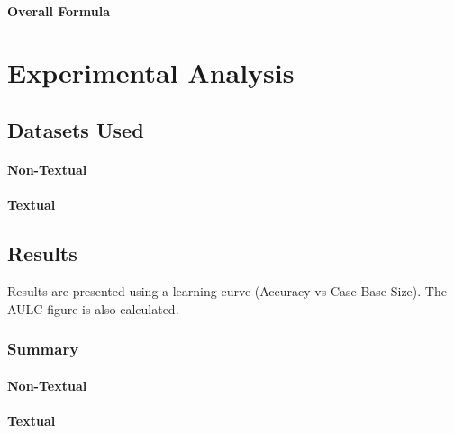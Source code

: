 \documentclass[a4paper,11pt]{report}
\begin{document}
\subsubsection{Overall Formula}

\chapter{Experimental Analysis\label{cha:expanalysis}}
\section{Datasets Used}
\subsubsection{Non-Textual}

\subsubsection{Textual}

\section{Results}
Results are presented using a learning curve (Accuracy vs Case-Base Size). The AULC figure is also calculated.

\begin{table}
\subsection{Summary}

\subsubsection{Non-Textual}
{\footnotesize {}}

\subsubsection{Textual}
{\footnotesize {}}
\end{table}
\end{document}
